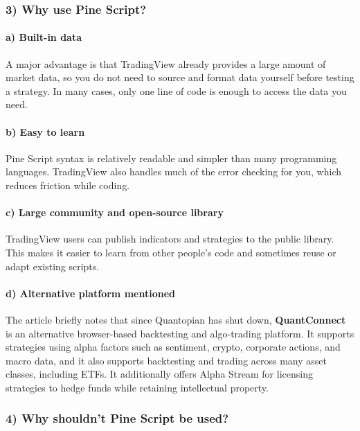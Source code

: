 \documentclass[12pt,openany]{book}
\begin{document}
\subsubsection{3) Why use Pine Script?}

\paragraph{a) Built-in data}

A major advantage is that TradingView already provides a large amount of market data, so you do not need to source and format data yourself before testing a strategy. In many cases, only one line of code is enough to access the data you need.

\paragraph{b) Easy to learn}

Pine Script syntax is relatively readable and simpler than many programming languages. TradingView also handles much of the error checking for you, which reduces friction while coding.

\paragraph{c) Large community and open-source library}

TradingView users can publish indicators and strategies to the public library. This makes it easier to learn from other people's code and sometimes reuse or adapt existing scripts.

\paragraph{d) Alternative platform mentioned}

The article briefly notes that since Quantopian has shut down, \textbf{QuantConnect} is an alternative browser-based backtesting and algo-trading platform. It supports strategies using alpha factors such as sentiment, crypto, corporate actions, and macro data, and it also supports backtesting and trading across many asset classes, including ETFs. It additionally offers Alpha Stream for licensing strategies to hedge funds while retaining intellectual property.

\subsubsection{4) Why shouldn't Pine Script be used?}
\end{document}
